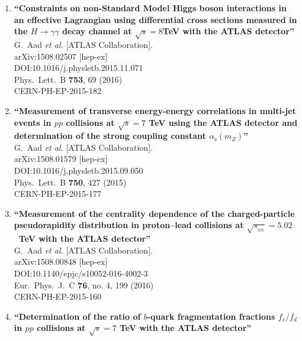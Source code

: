 \documentclass{article}
\begin{document}
\begin{enumerate}
\item%
{\bf ``Constraints on non-Standard Model Higgs boson interactions in an effective Lagrangian using differential cross sections measured in the $H \rightarrow \gamma\gamma$ decay channel at $\sqrt{s} = 8$TeV with the ATLAS detector''}
  \\{}G.~Aad {\it et al.} [ATLAS Collaboration].
  \\{}arXiv:1508.02507 [hep-ex]
  \\{}DOI:10.1016/j.physletb.2015.11.071
  \\{}Phys.\ Lett.\ B {\bf 753}, 69 (2016)
  \\{}CERN-PH-EP-2015-182
\item%
{\bf ``Measurement of transverse energy-energy correlations in multi-jet events in $pp$ collisions at $\sqrt{s} = 7$ TeV using the ATLAS detector and determination of the strong coupling constant $\alpha_{\mathrm{s}}(m_Z)$''}
  \\{}G.~Aad {\it et al.} [ATLAS Collaboration].
  \\{}arXiv:1508.01579 [hep-ex]
  \\{}DOI:10.1016/j.physletb.2015.09.050
  \\{}Phys.\ Lett.\ B {\bf 750}, 427 (2015)
  \\{}CERN-PH-EP-2015-177
\item%
{\bf ``Measurement of the centrality dependence of the charged-particle pseudorapidity distribution in proton–lead collisions at $\sqrt{s_{_\text {NN}}} = 5.02$  TeV with the ATLAS detector''}
  \\{}G.~Aad {\it et al.} [ATLAS Collaboration].
  \\{}arXiv:1508.00848 [hep-ex]
  \\{}DOI:10.1140/epjc/s10052-016-4002-3
  \\{}Eur.\ Phys.\ J.\ C {\bf 76}, no. 4, 199 (2016)
  \\{}CERN-PH-EP-2015-160
\item%
{\bf ``Determination of the ratio of $b$-quark fragmentation fractions $f_s/f_d$ in $pp$ collisions at $\sqrt{s}=7$ TeV with the ATLAS detector''}

\end{enumerate}
\end{document}
